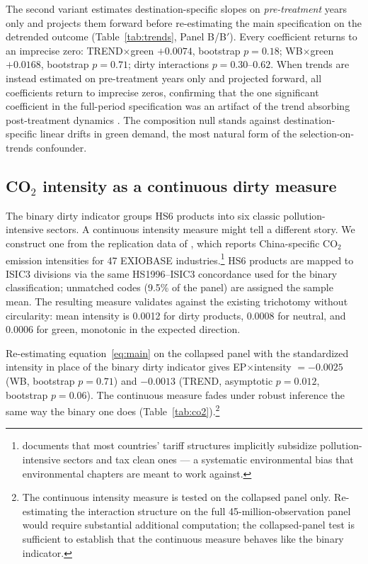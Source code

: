 \documentclass[12pt]{article}
\begin{document}
The second variant estimates destination-specific slopes on \emph{pre-treatment} years
only and projects them forward before re-estimating the main specification on the
detrended outcome (Table~\ref{tab:trends}, Panel B/B$'$). Every coefficient returns to an imprecise zero: TREND$\times$green
$+0.0074$, bootstrap $p = 0.18$; WB$\times$green $+0.0168$, bootstrap $p = 0.71$; dirty
interactions $p = 0.30$--$0.62$. When trends are instead estimated on pre-treatment years only and projected forward, all coefficients return to imprecise zeros, confirming that the one significant coefficient in the full-period specification was an artifact of the trend absorbing post-treatment dynamics \citep{wolfers2006}. The composition null
stands against destination-specific linear drifts in green demand, the most natural form
of the selection-on-trends confounder.



\subsection{CO$_2$ intensity as a continuous dirty measure}

The binary dirty indicator groups HS6 products into six classic pollution-intensive
sectors. A continuous intensity measure might tell a different story. We construct one
from the replication data of \citet{shapiro2021}, which reports China-specific CO$_2$
emission intensities for 47 EXIOBASE industries.\footnote{\citet{shapiro2021} documents that most countries' tariff structures implicitly subsidize pollution-intensive sectors and tax clean ones --- a systematic environmental bias that environmental chapters are meant to work against.} HS6 products are mapped to ISIC3
divisions via the same HS1996--ISIC3 concordance used for the binary classification;
unmatched codes (9.5\% of the panel) are assigned the sample mean. The resulting measure
validates against the existing trichotomy without circularity: mean intensity is 0.0012
for dirty products, 0.0008 for neutral, and 0.0006 for green, monotonic in the expected
direction.

Re-estimating equation~\eqref{eq:main} on the collapsed panel with the standardized
intensity in place of the binary dirty indicator gives EP$\times$intensity $= -0.0025$
(WB, bootstrap $p = 0.71$) and $-0.0013$ (TREND, asymptotic $p = 0.012$, bootstrap
$p = 0.06$). The continuous measure fades under robust inference the same way the binary
one does (Table~\ref{tab:co2}).\footnote{The continuous intensity measure is tested on the collapsed panel only. Re-estimating the interaction structure on the full 45-million-observation panel would require substantial additional computation; the collapsed-panel test is sufficient to establish that the continuous measure behaves like the binary indicator.}
\end{document}
